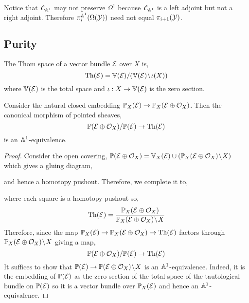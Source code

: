 \documentclass[12pt]{article}
\begin{document}
\begin{rmk}
Notice that $\mathcal{L}_{\mathbb{A}^1}$ may not preserve $\Omega^1$ because $\mathcal{L}_{\mathbb{A}^1}$ is a left adjoint but not a right adjoint. Therefore $\pi_i^{\mathbb{A}^1}(\Omega(\mathcal{Y}))$ need not equal $\pi_{i+1}(\mathcal{Y})$.
\end{rmk}

\subsection{Purity}

\newcommand{\Th}{\mathrm{Th}}
\newcommand{\cN}{\mathcal{N}}

\begin{defn}
The Thom space of a vector bundle $\mathcal{E}$ over $X$ is,
\[ \Th(\E) = \V(\E)  / (\V(\E) \sm \iota(X)) \]
where $\mathbb{V}(\mathcal{E})$ is the total space and $\iota : X \to \mathbb{V}(\mathcal{E})$ is the zero section.
\end{defn}

\begin{lemma}
Consider the natural closed embedding $\mathbb{P}_X(\mathcal{E}) \to \mathbb{P}_X(\mathcal{E} \oplus \mathcal{O}_{X})$. Then the canonical morphism of pointed sheaves,
\[ \P(\E \oplus \struct{X}) / \P(\E) \to \Th(\E) \]
is an $\mathbb{A}^1$-equivalence. 
\end{lemma}

\begin{proof}
Consider the open covering, $\mathbb{P}(\mathcal{E} \oplus \mathcal{O}_{X}) = \mathbb{V}_X(\mathcal{E}) \cup (\mathbb{P}_X(\mathcal{E} \oplus \mathcal{O}_{X}) \! \setminus \! X)$ which gives a gluing diagram,
\begin{center}
\end{center}
and hence a homotopy pushout. Therefore, we complete it to, 
\begin{center}
\end{center}
where each square is a homotopy pushout so,
\[ \Th(\E) = \frac{\P_X(\E \oplus \struct{X})}{\P_X(\E \oplus \struct{X}) \sm X} \]
Therefore, since the map $\P_X(\E) \to \P_X(\E \oplus \struct{X}) \to \Th(\E)$ factors through $\mathbb{P}_X(\mathcal{E} \oplus \mathcal{O}_{X}) \! \setminus \! X$ giving a map,
\[ \P(\E \oplus \struct{X}) / \P(\E) \to \Th(\E) \]
It suffices to show that $\mathbb{P}(\mathcal{E}) \to \mathbb{P}(\mathcal{E} \oplus \mathcal{O}_{X}) \! \setminus \! X$ is an $\mathbb{A}^1$-equivalence. Indeed, it is the embedding of $\mathbb{P}(\mathcal{E})$ as the zero section of the total space of the tautological bundle on $\mathbb{P}(\mathcal{E})$ so it is a vector bundle over $\mathbb{P}_X(\mathcal{E})$ and hence an $\mathbb{A}^1$-equivalence.  
\end{proof}
\end{document}
